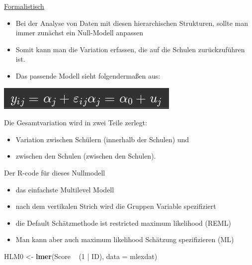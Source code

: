\documentclass[ignorenonframetext,]{beamer}
\newenvironment{Shaded}{}{}
\newcommand{\KeywordTok}[1]{\textcolor[rgb]{0.00,0.44,0.13}{\textbf{{#1}}}}
\newcommand{\DataTypeTok}[1]{\textcolor[rgb]{0.56,0.13,0.00}{{#1}}}
\newcommand{\DecValTok}[1]{\textcolor[rgb]{0.25,0.63,0.44}{{#1}}}
\newcommand{\StringTok}[1]{\textcolor[rgb]{0.25,0.44,0.63}{{#1}}}
\newcommand{\NormalTok}[1]{{#1}}
\providecommand{\tightlist}{%
\setlength{\itemsep}{0pt}\setlength{\parskip}{0pt}}
\begin{document}
\begin{frame}{\href{http://kesdev.com/you-got-latex-in-my-markdown/}{Formalistisch}}

\begin{itemize}
\item
  Bei der Analyse von Daten mit diesen hierarchischen Strukturen, sollte
  man immer zunächst ein Null-Modell anpassen
\item
  Somit kann man die Variation erfassen, die auf die Schulen
  zurückzuführen ist.
\item
  Das passende Modell sieht folgendermaßen aus:
\end{itemize}

\includegraphics{./tex2pdf.956/297df716f76288e608b5aebbd30917aeea4258a7.png}

Die Gesamtvariation wird in zwei Teile zerlegt:

\begin{itemize}
\tightlist
\item
  Variation zwischen Schülern (innerhalb der Schulen) und
\item
  zwischen den Schulen (zwischen den Schulen).
\end{itemize}

\end{frame}

\begin{frame}[fragile]{Der R-code für dieses Nullmodell}

\begin{itemize}
\tightlist
\item
  das einfachste Multilevel Modell
\item
  nach dem vertikalen Strich wird die Gruppen Variable spezifiziert
\item
  die Default Schätzmethode ist restricted maximum likelihood (REML)
\item
  Man kann aber auch maximum likelihood Schätzung spezifizieren (ML)
\end{itemize}

\begin{Shaded}
\begin{Highlighting}[]
\NormalTok{HLM0 <-}\StringTok{ }\KeywordTok{lmer}\NormalTok{(Score ~}\StringTok{ }\NormalTok{(}\DecValTok{1} \NormalTok{|}\StringTok{ }\NormalTok{ID), }\DataTypeTok{data =} \NormalTok{mlexdat)}
\end{Highlighting}
\end{Shaded}

\end{frame}
\end{document}

